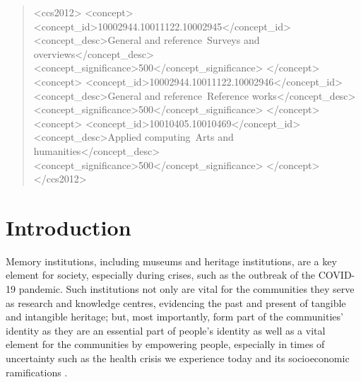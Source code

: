 \documentclass{egpubl}
\begin{document}
\begin{abstract}

\begin{CCSXML}
<ccs2012>
   <concept>
       <concept_id>10002944.10011122.10002945</concept_id>
       <concept_desc>General and reference~Surveys and overviews</concept_desc>
       <concept_significance>500</concept_significance>
       </concept>
   <concept>
       <concept_id>10002944.10011122.10002946</concept_id>
       <concept_desc>General and reference~Reference works</concept_desc>
       <concept_significance>500</concept_significance>
       </concept>
   <concept>
       <concept_id>10010405.10010469</concept_id>
       <concept_desc>Applied computing~Arts and humanities</concept_desc>
       <concept_significance>500</concept_significance>
       </concept>
 </ccs2012>
\end{CCSXML}


\printccsdesc   
\end{abstract}  
\section{Introduction}
\label{intro}
Memory institutions, including museums and heritage institutions, are a key element for society, especially during crises, such as the outbreak of the COVID-19 pandemic. Such institutions not only are vital for the communities they serve as research and knowledge centres, evidencing the past and present of tangible and intangible heritage; but, most importantly, form part of the communities' identity as they are an essential part of people's identity as well as a vital element for the communities by empowering people, especially in times of uncertainty such as the health crisis we experience today and its socioeconomic ramifications \cite{ICOM:2020}.
\end{document}

